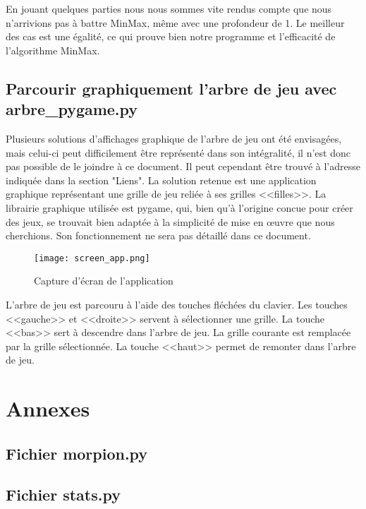 \documentclass{article}
\begin{document}
En jouant quelques parties nous nous sommes vite rendus compte que nous n'arrivions pas à battre MinMax, même avec une profondeur de 1. Le meilleur des cas est une égalité, ce qui prouve bien notre programme et l'efficacité de l'algorithme MinMax.

\subsection{Parcourir graphiquement l'arbre de jeu avec arbre\_pygame.py}

Plusieurs solutions d'affichages graphique de l'arbre de jeu ont été envisagées, mais celui-ci peut difficilement être représenté dans son intégralité, il n'est donc pas possible de le joindre à ce document. Il peut cependant être trouvé à l'adresse indiquée dans la section "Liens". La solution retenue est une application graphique représentant une grille de jeu reliée à ses grilles <<filles>>. La librairie graphique utilisée est pygame, qui, bien qu'à l'origine concue pour créer des jeux, se trouvait bien adaptée à la simplicité de mise en œuvre que nous cherchions. Son fonctionnement ne sera pas détaillé dans ce document.


\begin{figure}[!h]
\centering
\texttt{[image: screen\_app.png]}
\caption{Capture d'écran de l'application}
\label{screen}
\end{figure}

L'arbre de jeu est parcouru à l'aide des touches fléchées du clavier. Les touches <<gauche>> et <<droite>> servent à sélectionner une grille. La touche <<bas>> sert à descendre dans l'arbre de jeu. La grille courante est remplacée par la grille sélectionnée. La touche <<haut>> permet de remonter dans l'arbre de jeu.



\lstset{language=Python,frame=single,breaklines=true,extendedchars=true, numbers=left,basicstyle=\footnotesize}
\section{Annexes}

\subsection{Fichier morpion.py}

\subsection{Fichier stats.py}

\end{document}
